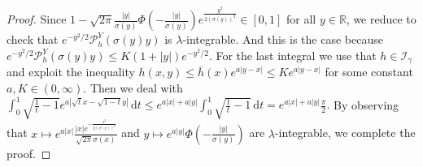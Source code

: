 \documentclass[12pt]{article}
\numberwithin{equation}{section}
\theoremstyle{definition}
\theoremstyle{remark}
\newcommand{\vd}{\,\mathrm{d}}
\newcommand{\Lg}[1]{\mathcal{I}_{#1}}
\begin{document}
\begin{proof}
Since $ 1- \sqrt{2\pi} \frac{|y|}{\sigma(y)} \Phi\left(-\frac{|y|}{\sigma(y)}\right) e^{\frac{y^2}{2(\sigma(y))^2}} \in [0,1]$ for all $y\in \mathbb{R}$,
we reduce to check that $e^{-y^2/2} \mathcal{P}_{h}^Y(\sigma(y)y)$ is $\lambda$-integrable. And this is the case because $e^{-y^2/2} \mathcal{P}_{h}^Y(\sigma(y)y) \leq K (1+|y|) e^{-y^2/2}$.
%
For the last integral we use that $h\in \Lg{\gamma}$ and exploit the inequality $h(x,y) \leq \bar{h}(x) e^{a|y-x|} \leq K e^{a|y-x|}$ for some constant $a,K\in (0,\infty)$. Then we deal with $\int_0^1 \sqrt{\frac1t -1} e^{a|\sqrt t x -\sqrt{1-t}y|} \vd t \leq e^{a|x|+a|y|} \int_0^1 \sqrt{\frac1t -1}  \vd t = e^{a|x|+a|y|}  \frac{\pi}2.$ 
By observing that $ x\mapsto e^{a|x|} \tfrac{ |x| e^{-\frac{x^2}{2(\sigma(x))^2}} }{\sqrt{2\pi}\sigma(x)} $  and $y \mapsto e^{a|y|}\Phi\left(-\frac{|y|}{\sigma(y)}\right)$ are $\lambda$-integrable, we complete the proof.
\end{proof}
\end{document}

